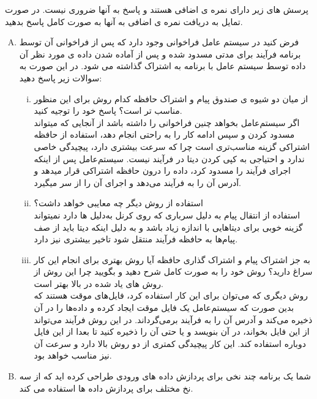 \documentclass[]{article}
\begin{document}
ﭘﺮﺳﺶ ﻫﺎﯼ ﺯﯾﺮ ﺩﺍﺭﺍﯼ ﻧﻤﺮﻩ ﯼ ﺍﺿﺎﻓﯽ ﻫﺴﺘﻨﺪ ﻭ ﭘﺎﺳﺦ ﺑﻪ ﺁﻧﻬﺎ ﺿﺮﻭﺭﯼ ﻧﯿﺴﺖ. ﺩﺭ ﺻﻮﺭﺕ ﺗﻤﺎﯾﻞ ﺑﻪ ﺩﺭﯾﺎﻓﺖ ﻧﻤﺮﻩ ﯼ ﺍﺿﺎﻓﯽ ﺑﻪ ﺁﻧﻬﺎ ﺑﻪ ﺻﻮﺭﺕ
ﮐﺎﻣﻞ ﭘﺎﺳﺦ ﺑﺪﻫﯿﺪ.

\begin{enumerate}[(A)]
    \item ﻓﺮﺽ ﮐﻨﯿﺪ ﺩﺭ ﺳﯿﺴﺘﻢ ﻋﺎﻣﻞ ﻓﺮﺍﺧﻮﺍﻧﯽ ﻭﺟﻮﺩ ﺩﺍﺭﺩ ﮐﻪ ﭘﺲ ﺍﺯ ﻓﺮﺍﺧﻮﺍﻧﯽ ﺁﻥ ﺗﻮﺳﻂ ﺑﺮﻧﺎﻣﻪ ﻓﺮﺁﯾﻨﺪ ﺑﺮﺍﯼ ﻣﺪﺗﯽ ﻣﺴﺪﻭﺩ ﺷﺪﻩ ﻭ ﭘﺲ ﺍﺯ ﺁﻣﺎﺩﻩ
    ﺷﺪﻥ ﺩﺍﺩﻩ ﯼ ﻣﻮﺭﺩ ﻧﻈﺮ ﺁﻥ ﺩﺍﺩﻩ ﺗﻮﺳﻂ ﺳﯿﺴﺘﻢ ﻋﺎﻣﻞ ﺑﺎ ﺑﺮﻧﺎﻣﻪ ﺑﻪ ﺍﺷﺘﺮﺍﮎ ﮔﺬﺍﺷﺘﻪ ﻣﯽ ﺷﻮﺩ. ﺩﺭ ﺍﯾﻦ ﺻﻮﺭﺕ ﺑﻪ ﺳﻮﺍﻻﺕ ﺯﯾﺮ ﭘﺎﺳﺦ ﺩﻫﯿﺪ:
        \begin{enumerate}[i.]
            \item ﺍﺯ ﻣﯿﺎﻥ ﺩﻭ ﺷﯿﻮﻩ ﯼ ﺻﻨﺪﻭﻕ ﭘﯿﺎﻡ ﻭ ﺍﺷﺘﺮﺍﮎ ﺣﺎﻓﻈﻪ ﮐﺪﺍﻡ ﺭﻭﺵ ﺑﺮﺍﯼ ﺍﯾﻦ ﻣﻨﻈﻮﺭ ﻣﻨﺎﺳﺐ ﺗﺮ ﺍﺳﺖ؟ ﭘﺎﺳﺦ ﺧﻮﺩ ﺭﺍ ﺗﻮﺟﯿﻪ ﮐﻨﯿﺪ.
            \\
            اگر سیستم‌عامل بخواهد چنین فراخوانی را داشته باشد از آنجایی که میتواند مسدود کردن و سپس ادامه کار را به راحتی انجام دهد،
            استفاده از حافظه اشتراکی گزینه مناسب‌تری است چرا که سرعت بیشتری دارد، پیچیدگی خاصی ندارد و احتیاجی به کپی کردن دیتا در فرآیند نیست.
            سیستم‌عامل پس از اینکه اجرای فرآیند را مسدود کرد، داده را درون حافظه اشتراکی قرار میدهد و آدرس آن را به فرآیند
            می‌دهد و اجرای آن را از سر میگیرد.
            \item ﺍﺳﺘﻔﺎﺩﻩ ﺍﺯ ﺭﻭﺵ ﺩﯾﮕﺮ ﭼﻪ ﻣﻌﺎﯾﺒﯽ ﺧﻮﺍﻫﺪ ﺩﺍﺷﺖ؟
            \\ استفاده از انتقال پیام به دلیل سرباری که روی کرنل به‌دلیل  ها
            دارد نمیتواند گزینه خوبی برای دیتا‌هایی با اندازه زیاد باشد و به دلیل اینکه دیتا باید از صف پیام‌ها
            به حافظه فرآیند منتقل شود تاخیر بیشتری نیز دارد. 
            \item ﺑﻪ ﺟﺰ ﺍﺷﺘﺮﺍﮎ ﭘﯿﺎﻡ ﻭ ﺍﺷﺘﺮﺍﮎ ﮔﺬﺍﺭﯼ ﺣﺎﻓﻈﻪ ﺁﯾﺎ ﺭﻭﺵ ﺑﻬﺘﺮﯼ ﺑﺮﺍﯼ ﺍﻧﺠﺎﻡ ﺍﯾﻦ ﮐﺎﺭ ﺳﺮﺍﻍ ﺩﺍﺭﯾﺪ؟ ﺭﻭﺵ ﺧﻮﺩ ﺭﺍ ﺑﻪ ﺻﻮﺭﺕ ﮐﺎﻣﻞ
            ﺷﺮﺡ ﺩﻫﯿﺪ ﻭ ﺑﮕﻮﯾﯿﺪ ﭼﺮﺍ ﺍﯾﻦ ﺭﻭﺵ ﺍﺯ ﺭﻭﺵ ﻫﺎﯼ ﯾﺎﺩ ﺷﺪﻩ ﺩﺭ ﺑﺎﻻ ﺑﻬﺘﺮ ﺍﺳﺖ.
            \\
            روش دیگری که می‌توان برای این کار استفاده کرد، فایل‌های موقت هستند که بدین صورت که سیستم‌عامل
            یک فایل موقت ایجاد کرده و داده‌ها را در آن ذخیره می‌کند و آدرس آن را به فرآیند برمی‌گرداند.
            در این روش فرآیند می‌تواند از این فایل بخواند، در آن بنویسد و یا حتی آن را ذخیره کنید تا
            بعدا از این فایل دوباره استفاده کند. این کار پیچیدگی کمتری از دو روش بالا دارد و سرعت آن نیز مناسب خواهد بود.
        \end{enumerate}
    \item  ﺷﻤﺎ ﯾﮏ ﺑﺮﻧﺎﻣﻪ ﭼﻨﺪ ﻧﺨﯽ ﺑﺮﺍﯼ ﭘﺮﺩﺍﺯﺵ ﺩﺍﺩﻩ ﻫﺎﯼ ﻭﺭﻭﺩﯼ ﻃﺮﺍﺣﯽ ﮐﺮﺩﻩ ﺍﯾﺪ ﮐﻪ ﺍﺯ ﺳﻪ ﻧﺦ ﻣﺨﺘﻠﻒ ﺑﺮﺍﯼ ﭘﺮﺩﺍﺯﺵ ﺩﺍﺩﻩ ﻫﺎ ﺍﺳﺘﻔﺎﺩﻩ ﻣﯽ ﮐﻨﺪ.

\end{enumerate}
\end{document}
